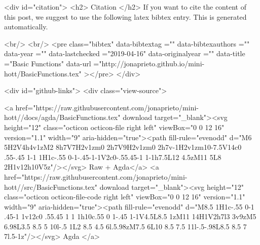   
  <div id="citation">
  <h2> Citation </h2>
  If you want to cite the content of this post,
  we suggest to use the following latex bibtex entry.
  This is generated automatically.

  <br/>
  <br/>
  <pre class="bibtex"
       data-bibtextag =""
       data-bibtexauthors =""
       data-year =""
       data-lastchecked ="2019-04-16"
       data-originalyear =""
       data-title ="Basic Functions"
       data-url ="http://jonaprieto.github.io/mini-hott/BasicFunctions.tex"
  ></pre>
  </div>
  

  <div id="github-links">
    <div class="view-source">
      
        <a href="https://raw.githubusercontent.com/jonaprieto/mini-hott//docs/agda/BasicFunctions.tex" download target="_blank"><svg height="12" class="octicon octicon-file right left" viewBox="0 0 12 16" version="1.1" width="9" aria-hidden="true"><path fill-rule="evenodd" d="M6 5H2V4h4v1zM2 8h7V7H2v1zm0 2h7V9H2v1zm0 2h7v-1H2v1zm10-7.5V14c0 .55-.45 1-1 1H1c-.55 0-1-.45-1-1V2c0-.55.45-1 1-1h7.5L12 4.5zM11 5L8 2H1v12h10V5z"/></svg> Raw + Agda</a>
        <a href="https://raw.githubusercontent.com/jonaprieto/mini-hott//src/BasicFunctions.tex" download target="_blank"><svg height="12" class="octicon octicon-file-code right left" viewBox="0 0 12 16" version="1.1" width="9" aria-hidden="true"><path fill-rule="evenodd" d="M8.5 1H1c-.55 0-1 .45-1 1v12c0 .55.45 1 1 1h10c.55 0 1-.45 1-1V4.5L8.5 1zM11 14H1V2h7l3 3v9zM5 6.98L3.5 8.5 5 10l-.5 1L2 8.5 4.5 6l.5.98zM7.5 6L10 8.5 7.5 11l-.5-.98L8.5 8.5 7 7l.5-1z"/></svg> Agda </a>
      
